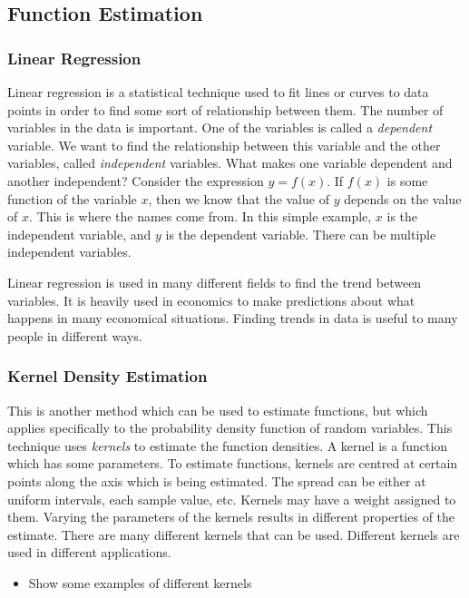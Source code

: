 \documentclass[a4paper,11pt]{article}
\begin{document}
\subsection{Function Estimation}
\label{sec-2-3}
\subsubsection{Linear Regression}
\label{sec-2-3-1}

Linear regression is a statistical technique used to fit lines or curves to data
points in order to find some sort of relationship between them. The number of
variables in the data is important. One of the variables is called a \emph{dependent}
variable. We want to find the relationship between this variable and the other
variables, called \emph{independent} variables. What makes one variable
dependent and another independent? Consider the expression $y=f(x)$. If $f(x)$
is some function of the variable $x$, then we know that the value of $y$ depends
on the value of $x$. This is where the names come from. In this simple example,
$x$ is the independent variable, and $y$ is the dependent variable. There can be
multiple independent variables.

Linear regression is used in many different fields to find the trend between
variables. It is heavily used in economics to make predictions about what
happens in many economical situations. Finding trends in data is useful to many
people in different ways.
\subsubsection{Kernel Density Estimation}
\label{sec-2-3-2}

This is another method which can be used to estimate functions, but which
applies specifically to the probability density function of random
variables. This technique uses \emph{kernels} to estimate the function
densities. A kernel is a function which has some parameters. To estimate
functions, kernels are centred at certain points along the axis which is being
estimated. The spread can be either at uniform intervals, each sample value,
etc. Kernels may have a weight assigned to them. Varying the parameters of
the kernels results in different properties of the estimate. There are many
different kernels that can be used. Different kernels are used in different
applications.
\begin{itemize}
\item Show some examples of different kernels
\end{itemize}
\end{document}
